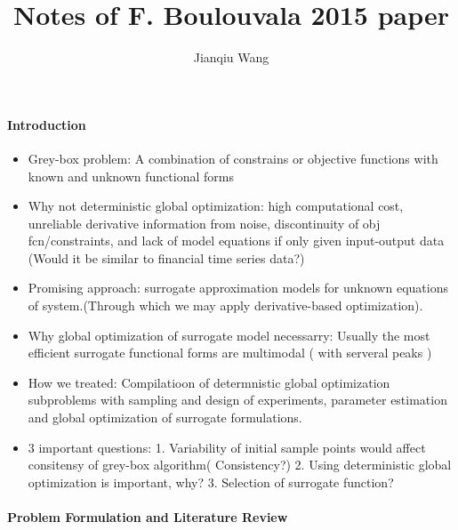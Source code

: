 \documentclass[letterpaper]{report}
\begin{document}
\title{Notes of F. Boulouvala 2015 paper}
\author{Jianqiu Wang}
\maketitle
\paragraph{Introduction}
\begin{itemize}
\item{Grey-box problem:} A combination of constrains or objective functions with known and unknown functional forms
\item{Why not deterministic global optimization:} high computational cost, unreliable derivative information from noise, discontinuity of obj fcn/constraints, and lack of model equations if only given input-output data (Would it be similar to financial time series data?)
\item{Promising approach:} surrogate approximation models for unknown equations of system.(Through which we may apply derivative-based optimization).
\item{Why global optimization of surrogate model necessarry:} Usually the most efficient surrogate functional forms are multimodal ( with serveral peaks )
\item{How we treated:} Compilatioon of determnistic global optimization subproblems with sampling and design of experiments, parameter estimation and global optimization of surrogate formulations.
\item{3 important questions:} 1. Variability of initial sample points would affect consitensy of grey-box algorithm( Consistency?) 2. Using deterministic global optimization is important, why? 3. Selection of surrogate function?
\end{itemize}
\paragraph{Problem Formulation and Literature Review}
\end{document}
